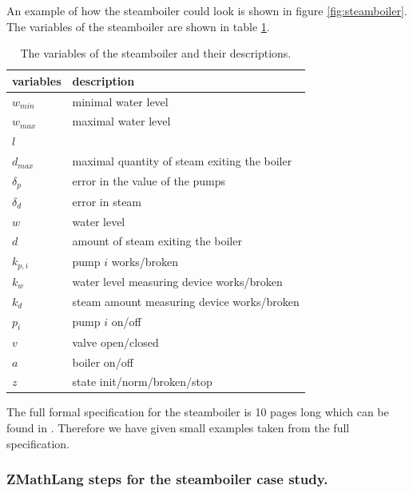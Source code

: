 An example of how the steamboiler could look is shown in figure \ref{fig:steamboiler}. The variables of the steamboiler are shown in table \ref{tab:steamboilervariables}.

\begin{table}[H]
\begin{tabular}{l|l}
\textbf{variables} & \textbf{description} \\
\hline
$w_{min}$ & minimal water level \\
$w_{max}$ & maximal water level \\
$l$ & \\
$d_{max}$ & maximal quantity of steam exiting the boiler \\
$\delta_{p}$ & error in the value of the pumps \\
$\delta_{d}$ & error in steam\\
$w$ & water level \\
$d$ &  amount of steam exiting the boiler \\
$k_{p,i}$ & pump $i$ works/broken \\
$k_{w}$ & water level measuring device works/broken \\
$k_{d}$ & steam amount measuring device works/broken\\
$p_{i}$ & pump $i$ on/off \\
$v$ & valve open/closed \\
$a$ & boiler on/off \\
$z$ & state init/norm/broken/stop 
\end{tabular}
\caption{The variables of the steamboiler and their descriptions. \label{tab:steamboilervariables}}
\end{table}

The full formal specification for the steamboiler is 10 pages long which can be found in \cite{mathlangexamples}. Therefore we have given small examples taken from the full specification.

\subsubsection{ZMathLang steps for the steamboiler case study.}

